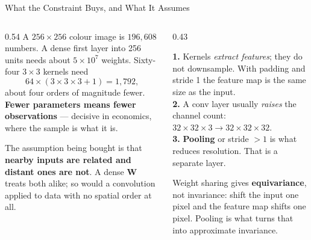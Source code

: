 \begin{frame}{What the Constraint Buys, and What It Assumes}
\begin{columns}[T]
\begin{column}{0.54\textwidth}
\small
A $256\times256$ colour image is $196{,}608$ numbers. A dense first layer into 256 units needs about $5\times10^{7}$ weights. Sixty-four $3\times3$ kernels need
\[
  64\times(3\times3\times3+1)=1{,}792,
\]
about four orders of magnitude fewer. \textbf{Fewer parameters means fewer observations} --- decisive in economics, where the sample is what it is.
\medskip

The assumption being bought is that \textbf{nearby inputs are related and distant ones are not}. A dense $\mathbf{W}$ treats both alike; so would a convolution applied to data with no spatial order at all.
\end{column}
\begin{column}{0.43\textwidth}
\begin{cautionbox}[title=\textbf{Three things to keep apart}]\footnotesize
\textbf{1.} Kernels \emph{extract features}; they do not downsample. With padding and stride 1 the feature map is the same size as the input.\\[1mm]
\textbf{2.} A conv layer usually \emph{raises} the channel count: $32\!\times\!32\!\times\!3\to32\!\times\!32\!\times\!32$.\\[1mm]
\textbf{3.} \textbf{Pooling} or stride $>1$ is what reduces resolution. That is a separate layer.
\end{cautionbox}
\medskip
\begin{examplebox}\footnotesize
Weight sharing gives \textbf{equivariance}, not invariance: shift the input one pixel and the feature map shifts one pixel. Pooling is what turns that into approximate invariance.
\end{examplebox}
\end{column}
\end{columns}
\vspace{1mm}
\end{frame}

